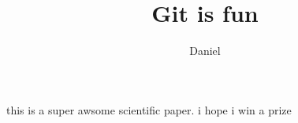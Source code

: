 \documentclass[10pt]{article}
\author{Daniel}
\title{Git is fun}
\begin{document}
	\maketitle	

	this is a super awsome scientific paper.
	i hope i win a prize
\end{document}
